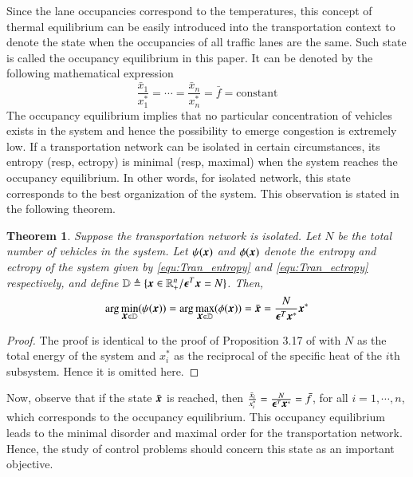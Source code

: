 \documentclass[preprint,authoryear,12pt]{elsarticle}
\renewcommand{\vec}[1]{\mbox{\boldmath$#1$}}
\newtheorem{thm}{Theorem}
\begin{document}
Since the lane occupancies correspond to the temperatures, this
concept of thermal equilibrium can be easily introduced into the
transportation context to denote the state when the occupancies of
all traffic lanes are the same. Such state is called the occupancy
equilibrium in this paper. It can be denoted by the following
mathematical expression
\begin{equation}\label{equ:equilibrium}
\frac{\bar{x}_1}{x_1^*}=\cdots=\frac{\bar{x}_n}{x_n^*}=\bar{f}=\text{constant}
\end{equation}
The occupancy equilibrium implies that no particular concentration of
vehicles exists in the system and hence the possibility to emerge
congestion is extremely low.
If a transportation network can be isolated in certain circumstances,
its entropy (resp, ectropy) is minimal (resp, maximal) when
the system reaches the occupancy equilibrium. In other words, for
isolated network, this state corresponds to the best organization of
the system. This observation is stated in the following theorem.

\begin{thm}\label{thm:entropy_equilibrium}
Suppose the transportation network is isolated. Let $N$ be the total
number of vehicles in the system. Let $\psi(\vec{x})$ and
$\phi(\vec{x})$ denote the entropy and ectropy of the system  given
by \eqref{equ:Tran_entropy} and \eqref{equ:Tran_ectropy}
respectively, and define $\mathbb{D}\triangleq
\{\vec{x}\in\mathbb{R}^n_+/\vec{\epsilon}^T\vec{x}=N\}$. Then,
\begin{equation}\label{equ:entropy_equilibrium}
\arg\min_{\vec{x}\in\mathbb{D}}(\psi(\vec{x})) =
\arg\max_{\vec{x}\in\mathbb{D}}(\phi(\vec{x})) = \bar{\vec{x}} =
\frac{N}{\vec{\epsilon}^T\vec{x}^*}\vec{x}^*
\end{equation}
\end{thm}
\begin{proof}  The proof is identical to the proof of Proposition 3.17 of \citet{haddad_thermodynamic_2005} with $N$ as the total energy of the system 
and $x^*_i$ as the reciprocal of the specific heat of the $i$th subsystem. Hence it is omitted here.
\end{proof}%

Now, observe that if the state $ \bar{\vec{x}}$ is reached, then
$\frac{\bar{x}_i}{x_i^*}=\frac{N}{\vec{\epsilon}^T\vec{x}^*}=\bar{f}$,
for all $i=1,\cdots, n$, which corresponds to the occupancy
equilibrium. This occupancy equilibrium leads to the minimal disorder
and maximal order for the transportation network. Hence, the study of
control problems should concern this state as an important objective.
\end{document}
